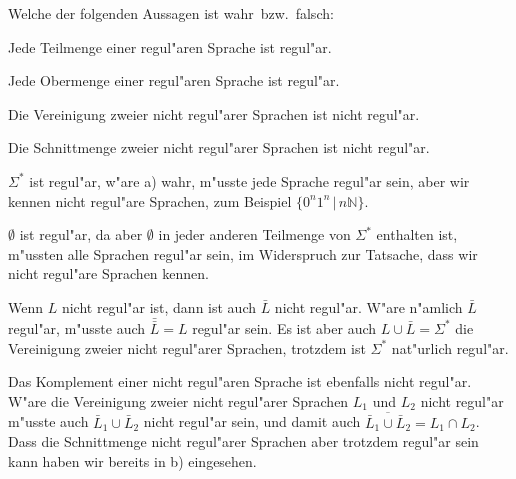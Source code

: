 Welche der folgenden Aussagen ist wahr~bzw.~falsch:
\begin{teilaufgaben}
\item Jede Teilmenge einer regul"aren Sprache ist regul"ar.
\item Jede Obermenge einer regul"aren Sprache ist regul"ar.
\item Die Vereinigung zweier nicht regul"arer Sprachen ist nicht regul"ar.
\item Die Schnittmenge zweier nicht regul"arer Sprachen ist nicht
regul"ar.
\end{teilaufgaben}

\begin{loesung}
\begin{teilaufgaben}
\item $\Sigma^*$ ist regul"ar, w"are a) wahr, m"usste jede Sprache regul"ar
sein, aber wir kennen nicht regul"are Sprachen, zum Beispiel
$\{0^n1^n\,|\,n\mathbb N\}$.
\item $\emptyset$ ist regul"ar, da aber $\emptyset$ in jeder anderen
Teilmenge von $\Sigma^*$ enthalten ist, m"ussten alle Sprachen regul"ar
sein, im Widerspruch zur Tatsache, dass wir nicht regul"are Sprachen
kennen.
\item Wenn $L$ nicht regul"ar ist, dann ist auch $\bar L$ nicht regul"ar.
W"are n"amlich $\bar L$ regul"ar, m"usste auch $\bar{\bar L}=L$ regul"ar
sein. Es ist aber auch $L\cup \bar L=\Sigma^*$ die Vereinigung zweier
nicht regul"arer Sprachen, trotzdem ist $\Sigma^*$ nat"urlich regul"ar.
\item Das Komplement einer nicht regul"aren Sprache ist ebenfalls nicht
regul"ar. W"are die Vereinigung zweier nicht regul"arer Sprachen $L_1$
und $L_2$ nicht regul"ar m"usste auch $\bar L_1\cup \bar L_2$ nicht
regul"ar sein, und damit auch $\overline{\bar L_1\cup \bar L_2}=L_1\cap L_2$.
Dass die Schnittmenge nicht regul"arer Sprachen aber trotzdem regul"ar
sein kann haben wir bereits in b) eingesehen.
\end{teilaufgaben}
\end{loesung}

